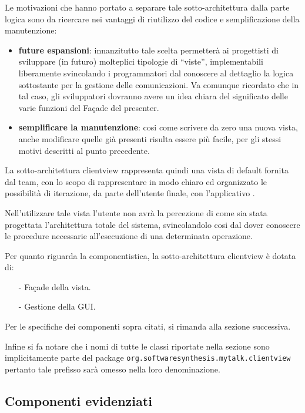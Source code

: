 Le motivazioni che hanno portato a separare tale sotto-architettura dalla parte logica sono da ricercare nei vantaggi di riutilizzo del codice e semplificazione della manutenzione:
\begin{itemize}
 	\item \textbf{future espansioni}: innanzitutto tale scelta permetterà ai progettisti di sviluppare (in futuro) molteplici tipologie di ``viste'', implementabili liberamente svincolando i programmatori dal conoscere al dettaglio la logica sottostante per la gestione delle comunicazioni. Va comunque ricordato che in tal caso, gli sviluppatori dovranno avere un idea chiara del significato delle varie funzioni del Façade del presenter.
 	\item \textbf{semplificare la manutenzione}: cosi come scrivere da zero una nuova vista, anche modificare quelle già presenti risulta essere più facile, per gli stessi motivi descritti al punto precedente.
\end{itemize}

La sotto-architettura clientview rappresenta quindi una vista di default fornita dal team, con lo scopo di rappresentare in modo chiaro ed organizzato le possibilità di iterazione, da parte dell'utente finale, con l'applicativo \caName{}.

Nell'utilizzare tale vista l'utente non avrà la percezione di come sia stata progettata l'architettura totale del sistema, svincolandolo cosi dal dover conoscere le procedure necessarie all'esecuzione di una determinata operazione.

Per quanto riguarda la componentistica, la sotto-architettura clientview è dotata di:
\begin{itemize}[noitemsep,nolistsep]
	\item[-] Façade della vista.
	\item[-] Gestione della GUI.
\end{itemize}

Per le specifiche dei componenti sopra citati, si rimanda alla sezione successiva.

Infine si fa notare che i nomi di tutte le classi riportate nella sezione sono implicitamente parte del package \texttt{org.softwaresynthesis.mytalk.clientview} pertanto tale prefisso sarà omesso nella loro denominazione.

\subsection{Componenti evidenziati}

